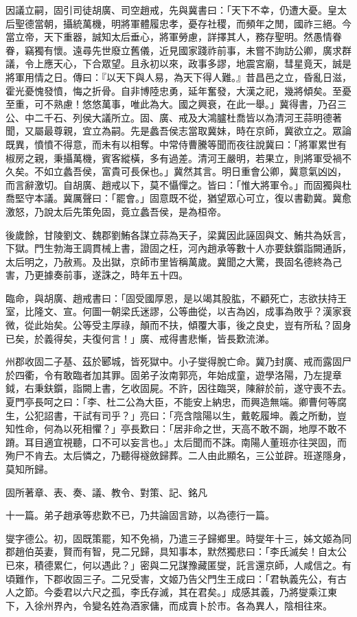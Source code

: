 \begin{pinyinscope}
因議立嗣，固引司徒胡廣、司空趙戒，先與冀書曰：「天下不幸，仍遭大憂。皇太后聖德當朝，攝統萬機，明將軍體履忠孝，憂存社稷，而頻年之閒，國祚三絕。今當立帝，天下重器，誠知太后垂心，將軍勞慮，詳擇其人，務存聖明。然愚情眷眷，竊獨有懷。遠尋先世廢立舊儀，近見國家踐祚前事，未嘗不詢訪公卿，廣求群議，令上應天心，下合眾望。且永初以來，政事多謬，地震宮廟，彗星竟天，誠是將軍用情之日。傳曰：『以天下與人易，為天下得人難。』昔昌邑之立，昏亂日滋，霍光憂愧發憤，悔之折骨。自非博陸忠勇，延年奮發，大漢之祀，幾將傾矣。至憂至重，可不熟慮！悠悠萬事，唯此為大。國之興衰，在此一舉。」冀得書，乃召三公、中二千石、列侯大議所立。固、廣、戒及大鴻臚杜喬皆以為清河王蒜明德著聞，又屬最尊親，宜立為嗣。先是蠡吾侯志當取冀妹，時在京師，冀欲立之。眾論既異，憤憤不得意，而未有以相奪。中常侍曹騰等聞而夜往說冀曰：「將軍累世有椒房之親，秉攝萬機，賓客縱橫，多有過差。清河王嚴明，若果立，則將軍受禍不久矣。不如立蠡吾侯，富貴可長保也。」冀然其言。明日重會公卿，冀意氣凶凶，而言辭激切。自胡廣、趙戒以下，莫不懾憚之。皆曰：「惟大將軍令。」而固獨與杜喬堅守本議。冀厲聲曰：「罷會。」固意既不從，猶望眾心可立，復以書勸冀。冀愈激怒，乃說太后先策免固，竟立蠡吾侯，是為桓帝。

後歲餘，甘陵劉文、魏郡劉鮪各謀立蒜為天子，梁冀因此誣固與文、鮪共為妖言，下獄。門生勃海王調貫械上書，證固之枉，河內趙承等數十人亦要鈇鑕詣闕通訴，太后明之，乃赦焉。及出獄，京師市里皆稱萬歲。冀聞之大驚，畏固名德終為己害，乃更據奏前事，遂誅之，時年五十四。

臨命，與胡廣、趙戒書曰：「固受國厚恩，是以竭其股肱，不顧死亡，志欲扶持王室，比隆文、宣。何圖一朝梁氏迷謬，公等曲從，以吉為凶，成事為敗乎？漢家衰微，從此始矣。公等受主厚祿，顛而不扶，傾覆大事，後之良史，豈有所私？固身已矣，於義得矣，夫復何言！」廣、戒得書悲慚，皆長歎流涕。

州郡收固二子基、茲於郾城，皆死獄中。小子燮得脫亡命。冀乃封廣、戒而露固尸於四衢，令有敢臨者加其罪。固弟子汝南郭亮，年始成童，遊學洛陽，乃左提章鉞，右秉鈇鑕，詣闕上書，乞收固屍。不許，因往臨哭，陳辭於前，遂守喪不去。夏門亭長呵之曰：「李、杜二公為大臣，不能安上納忠，而興造無端。卿曹何等腐生，公犯詔書，干試有司乎？」亮曰：「亮含陰陽以生，戴乾履坤。義之所動，豈知性命，何為以死相懼？」亭長歎曰：「居非命之世，天高不敢不跼，地厚不敢不蹐。耳目適宜視聽，口不可以妄言也。」太后聞而不誅。南陽人董班亦往哭固，而殉尸不肯去。太后憐之，乃聽得襚斂歸葬。二人由此顯名，三公並辟。班遂隱身，莫知所歸。

固所著章、表、奏、議、教令、對策、記、銘凡

十一篇。弟子趙承等悲歎不已，乃共論固言跡，以為德行一篇。

燮字德公。初，固既策罷，知不免禍，乃遣三子歸鄉里。時燮年十三，姊文姬為同郡趙伯英妻，賢而有智，見二兄歸，具知事本，默然獨悲曰：「李氏滅矣！自太公已來，積德累仁，何以遇此？」密與二兄謀豫藏匿燮，託言還京師，人咸信之。有頃難作，下郡收固三子。二兄受害，文姬乃告父門生王成曰：「君執義先公，有古人之節。今委君以六尺之孤，李氏存滅，其在君矣。」成感其義，乃將燮乘江東下，入徐州界內，令變名姓為酒家傭，而成賣卜於巿。各為異人，陰相往來。


\end{pinyinscope}
